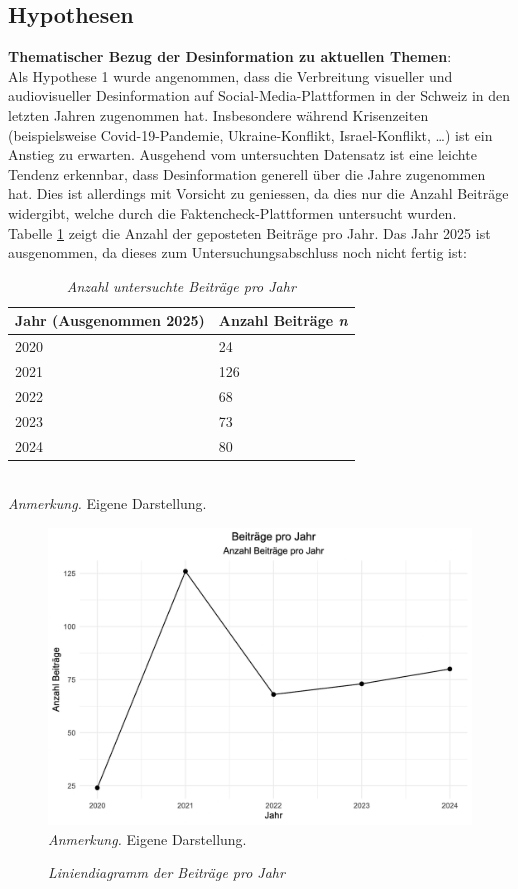 \documentclass[12pt,a4paper]{article}        %
\begin{document}
\subsection{Hypothesen}
\textbf{Thematischer Bezug der Desinformation zu aktuellen Themen}:\\
Als Hypothese 1 wurde angenommen, dass die Verbreitung visueller und audiovisueller Desinformation auf Social-Media-Plattformen in der Schweiz in den letzten Jahren zugenommen hat. Insbesondere während Krisenzeiten (beispielsweise Covid-19-Pandemie, Ukraine-Konflikt, Israel-Konflikt, …) ist ein Anstieg zu erwarten.
Ausgehend vom untersuchten Datensatz ist eine leichte Tendenz erkennbar, dass Desinformation generell über die Jahre zugenommen hat. Dies ist allerdings mit Vorsicht zu geniessen, da dies nur die Anzahl Beiträge widergibt, welche durch die Faktencheck-Plattformen untersucht wurden.\\
Tabelle \ref{tab:results_posts_per_year} zeigt die Anzahl der geposteten Beiträge pro Jahr. Das Jahr 2025 ist ausgenommen, da dieses zum Untersuchungsabschluss noch nicht fertig ist:
\begin{table}[H]
  \caption{\textit{Anzahl untersuchte Beiträge pro Jahr}}
  \label{tab:results_posts_per_year}
  \centering
  \begin{tabular}{|l|l|} \hline
    \textbf{Jahr} (Ausgenommen 2025) & \textbf{Anzahl Beiträge \textit{n}}\\ \hline
    2020& 24\\ \hline
    2021& 126\\ \hline
    2022& 68\\ \hline
    2023&73\\\hline
    2024&80\\\hline
  \end{tabular}\\
  \footnotesize\textit{Anmerkung.} Eigene Darstellung.
\end{table}
\begin{figure}[H]
  \caption{\textit{Liniendiagramm der Beiträge pro Jahr}}
  \label{fig:results_posts_per_year_plot}
  \centering
  \includegraphics[width=0.75\linewidth]{images/posts_per_year_plot.png} \\
  \footnotesize\textit{Anmerkung.} Eigene Darstellung.
\end{figure}
\end{document}
